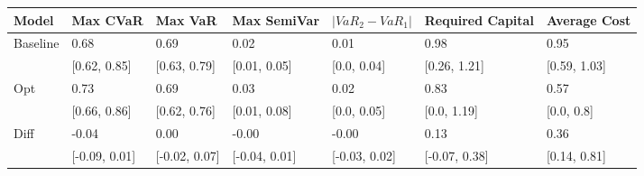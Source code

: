 \begin{tabular}{lllllll}
\toprule
   Model &      Max CVaR &       Max VaR &   Max SemiVar & $|VaR_2 - VaR_1|$ & Required Capital & Average Cost \\
\midrule
Baseline &          0.68 &          0.69 &          0.02 &              0.01 &             0.98 &         0.95 \\
         &  [0.62, 0.85] &  [0.63, 0.79] &  [0.01, 0.05] &       [0.0, 0.04] &     [0.26, 1.21] & [0.59, 1.03] \\
     Opt &          0.73 &          0.69 &          0.03 &              0.02 &             0.83 &         0.57 \\
         &  [0.66, 0.86] &  [0.62, 0.76] &  [0.01, 0.08] &       [0.0, 0.05] &      [0.0, 1.19] &   [0.0, 0.8] \\
    Diff &         -0.04 &          0.00 &         -0.00 &             -0.00 &             0.13 &         0.36 \\
         & [-0.09, 0.01] & [-0.02, 0.07] & [-0.04, 0.01] &     [-0.03, 0.02] &    [-0.07, 0.38] & [0.14, 0.81] \\
\bottomrule
\end{tabular}
